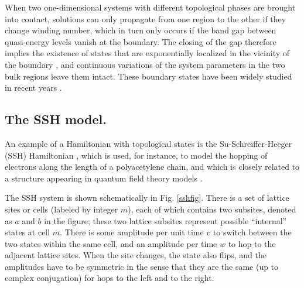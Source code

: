 \documentclass[twocolumn,amsmath, amssymb, superscriptaddress, pra]{revtex4}
\begin{document}
When two one-dimensional systems with different topological phases are
brought into contact, solutions can only propagate from one region to the
other if they change winding number, which in turn only occurs if the band
gap between quasi-energy levels vanish at the boundary. The closing of the
gap therefore implies the existence of states that are exponentially
localized in the vicinity of the boundary \cite{kitagawa,asboth}, and
continuous variations of the system parameters in the two bulk regions leave
them intact.  These boundary states have been widely studied in recent years
\cite{obuse,asboth2,asob,edge}.




%
%

\subsection{The SSH model.} An example of a Hamiltonian with topological states is the Su-Schreiffer-Heeger (SSH) Hamiltonian \cite{su}, which is used, for
instance, to model  the hopping of electrons along the length of a polyacetylene chain, and which is closely related to a structure appearing in quantum field
theory models \cite{jackiw}.

The SSH system is shown schematically in Fig. \ref{sshfig}. There is a set of lattice sites or cells (labeled by integer $m$), each of which contains two
subsites, denoted as $a$ and $b$ in the figure; these two lattice subsites represent possible ``internal'' states at cell $m$.  There is some amplitude per unit
time $v$ to switch between the two states within the same cell, and an amplitude per time $w$ to hop to the adjacent lattice sites. When the site changes, the
state also flips, and the amplitudes have to be symmetric in the sense that they are the same (up to complex conjugation) for hops to the left and to the right.
\end{document}
